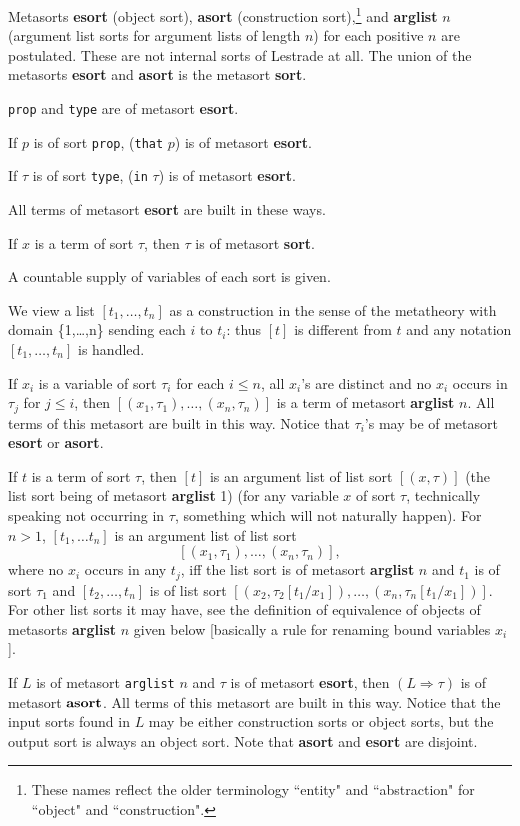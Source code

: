 \documentclass[12pt]{article}
\begin{document}
Metasorts {\bf esort} (object sort), {\bf asort} (construction sort),\footnote{These names reflect the older terminology ``entity" and ``abstraction" for ``object" and ``construction".} and {\bf arglist} $n$ (argument list sorts for argument lists of length $n$) for each positive $n$
are postulated.  These are not internal sorts of Lestrade at all.  The union of the metasorts {\bf esort} and {\bf asort} is the metasort {\bf sort}.

{\tt prop} and {\tt type} are of metasort {\bf esort}.

If $p$ is of sort {\tt prop},  ({\tt that} $p$) is of metasort {\bf esort}.

If $\tau$ is of sort {\tt type}, ({\tt in} $\tau$) is of metasort {\bf esort}.

All terms of metasort {\bf esort} are built in these ways.

If $x$ is a term of sort $\tau$, then $\tau$ is of metasort {\bf sort}.

A countable supply of variables of each sort is given.

We view a list $[t_1,\ldots,t_n]$ as a construction in the sense of the metatheory with domain \{1,\ldots,n\} sending each $i$ to $t_i$:  thus
$[t]$ is different from $t$ and any notation $[t_1,\ldots,t_n]$ is handled.

If $x_i$ is a variable of sort $\tau_i$ for each $i \leq n$, all $x_i$'s are distinct and no $x_i$ occurs in $\tau_j$ for $j\leq i$, then
$[(x_1,\tau_1),\ldots,(x_n,\tau_n)]$ is a term of metasort {\bf arglist} $n$.  All terms of this metasort are built in this way.  Notice
that $\tau_i$'s may be of metasort {\bf esort} or {\bf asort}.

If $t$ is a term of sort $\tau$, then $[t]$ is an argument list of list sort $[(x,\tau)]$ (the list sort being of metasort {\bf arglist} 1) (for any variable $x$ of sort $\tau$, technically speaking not occurring in $\tau$, something which will not naturally happen).  For $n>1$,  $[t_1,\ldots t_n]$ is an argument list of list sort $$[(x_1,\tau_1),\ldots,(x_n,\tau_n)],$$ where no $x_i$ occurs in any $t_j$, iff  the list sort is of metasort {\bf arglist} $n$ and
$t_1$ is of sort $\tau_1$ and $[t_2,\ldots,t_n]$ is of list sort $[(x_2,\tau_2[t_1/x_1]),\ldots,(x_n,\tau_n[t_1/x_1])]$.  For other list sorts it may have, see the definition of equivalence
of objects of metasorts {\bf arglist} $n$ given below [basically a rule for renaming bound variables $x_i$].

If $L$ is of metasort {\tt arglist} $n$ and $\tau$ is of metasort {\bf esort}, then $(L \Rightarrow \tau)$ is of metasort ${\bf asort}$.  All terms of this metasort are built in this way.
Notice that the input sorts found in $L$ may be either construction sorts or object sorts, but the output sort is always an object sort.   Note that {\bf asort} and {\bf esort} are disjoint.
\end{document}
